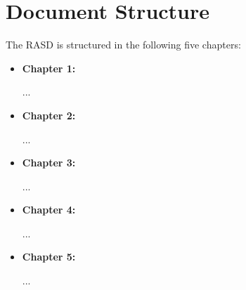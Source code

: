 \section{Document Structure}

The RASD is structured in the following five chapters:
\begin{itemize}
\item \textbf{Chapter 1:} 

...
\item \textbf{Chapter 2:} 

...
\item \textbf{Chapter 3:}

...
\item \textbf{Chapter 4:}

...
\item \textbf{Chapter 5:}

...
\end{itemize}
